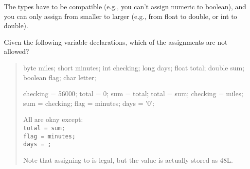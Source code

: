 \vspace{-1em}
\begin{answer}
The types have to be compatible (e.g., you can't assign numeric to boolean), and you can only assign from smaller to larger (e.g., from float to double, or int to double).
\end{answer}


\Q Given the following variable declarations, which of the assignments are not allowed?

\begin{quote}
\begin{multicols}{3}

\begin{javalst}
byte miles;
short minutes;
int checking;
long days;
float total;
double sum;
boolean flag;
char letter;
\end{javalst}

\columnbreak

\begin{javalst}
checking = 56000;
total = 0;
sum = total;
total = sum;
checking = miles;
sum = checking;
flag = minutes;
days = '0';
\end{javalst}

\columnbreak

\begin{answer}
All are okay except:
\\ \hspace*{1em} \texttt{total = sum;}
\\ \hspace*{1em} \texttt{flag = minutes;}
\\ \hspace*{1em} \texttt{days = ;}

\medskip
Note that assigning  to  is legal,
but the value is actually stored as 48L.
\end{answer}

\end{multicols}
\end{quote}


%
